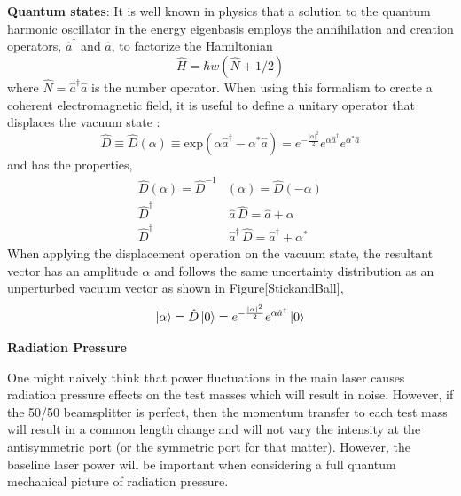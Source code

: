 		\textbf{Quantum states}:
		It is well known in physics \cite{Shankar} \cite{Griffiths} that a solution to the quantum harmonic oscillator in the energy eigenbasis employs the annihilation and creation  operators, $\hat{a}^{\dagger}$ and $\hat{a}$, to factorize the Hamiltonian
		\begin{equation}
		\hat{H} = \hbar w (\hat{N} + 1/2)
		\end{equation} 
		where $\hat{N} = \hat{a}^{\dagger}  \hat{a}$ is the number operator.  When using this formalism to create a coherent electromagnetic field, it is useful to define a unitary operator that displaces the vacuum state \cite{GerryKnight}:
		\begin{equation}
		\hat{D} \equiv \hat{D}(\alpha) \equiv \text{exp}(\alpha \hat{a}^{\dagger} - \alpha^{*} \hat{a} ) = e^{-\frac{\vert{\alpha}\vert^2}{2}} e^{\alpha \hat{a}^{\dagger} } e^{\alpha^{*} \hat{a} }
		\end{equation}
		and has the properties,
		\begin{equation}
		\begin{aligned}
		\hat{D}(\alpha) = \hat{D}^{-1}&(\alpha) = \hat{D}(-\alpha)\\
		\hat{D}^\dagger&\, \hat{a} 		\,\hat{D}			= \hat{a} + \alpha \\ 
		\hat{D}^\dagger&\, \hat{a}^\dagger \,\hat{D} 		= \hat{a}^\dagger + \alpha^*
		\end{aligned}
		\end{equation}
		When applying the displacement operation on the vacuum state, the resultant vector has an amplitude $\alpha$ and follows the same uncertainty distribution as an unperturbed vacuum vector as shown in Figure[StickandBall],
		\begin{equation}
		\ket{\alpha} = \hat{D} \ket{0} =  e^{-\frac{\vert{\alpha}\vert^2}{2}} e^{\alpha \hat{a}^{\dagger} } \ket{0}
		\end{equation}
		
		\textbf{Radiation Pressure}
		
		One might naively think that power fluctuations in the main laser causes radiation pressure effects on the test masses which will result in noise.  However, if the 50/50 beamsplitter is perfect, then the momentum transfer to each test mass will result in a common length change and will not vary the intensity at the antisymmetric port (or the symmetric port for that matter).  However, the baseline laser power will be important when considering a full quantum mechanical picture of radiation pressure.
		
